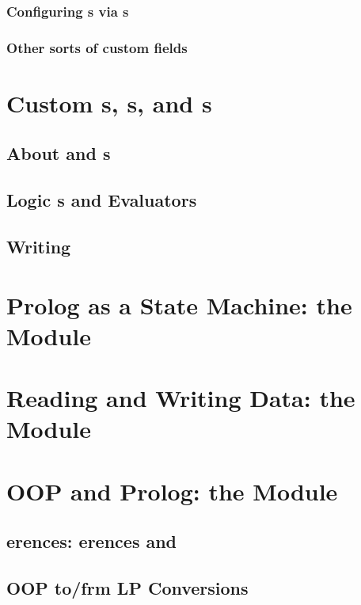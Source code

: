 \documentclass[presentation]{beamer}
\begin{document}
\subsubsection{Configuring s via s}

\subsubsection{Other sorts of custom fields}

\section{Custom s, s, and s}

\subsection{About  and s}

\subsection{Logic s and Evaluators}

\subsection{Writing }

\section{Prolog as a State Machine: the  Module}

\section{Reading and Writing Data: the  Module}

\section{OOP and Prolog: the  Module}

\subsection{erences: erences and }

\subsection{OOP to/frm LP Conversions}
\end{document}
